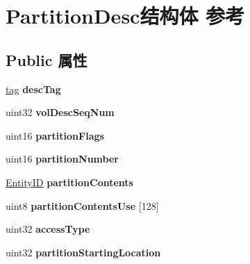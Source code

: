 \hypertarget{struct_partition_desc}{}\section{Partition\+Desc结构体 参考}
\label{struct_partition_desc}
\subsection*{Public 属性}
\begin{DoxyCompactItemize}
\item 
\mbox{\label{struct_partition_desc_ad593c30334d531b7a2bec7086b858d5e}} 
\hyperlink{structtag}{tag} {\bfseries desc\+Tag}
\item 
\mbox{\label{struct_partition_desc_aef4572ab5e618cb780607acfc39feb08}} 
uint32 {\bfseries vol\+Desc\+Seq\+Num}
\item 
\mbox{\label{struct_partition_desc_a9b502351c19a5cbfe77955ba0ca4bff6}} 
uint16 {\bfseries partition\+Flags}
\item 
\mbox{\label{struct_partition_desc_ad5e77ffa7847135ea9206327bab3f849}} 
uint16 {\bfseries partition\+Number}
\item 
\mbox{\label{struct_partition_desc_aae3e6e835a287fcccd18d990a566ca1c}} 
\hyperlink{struct_entity_i_d}{Entity\+ID} {\bfseries partition\+Contents}
\item 
\mbox{\label{struct_partition_desc_ac922bc92cdde44a2eca6a3215742e72d}} 
uint8 {\bfseries partition\+Contents\+Use} \mbox{[}128\mbox{]}
\item 
\mbox{\label{struct_partition_desc_a8ab955d10bdfb72952bf9b12737ba49f}} 
uint32 {\bfseries access\+Type}
\item 
\mbox{\label{struct_partition_desc_a30e75269917b384cd821fec1238e3829}} 
uint32 {\bfseries partition\+Starting\+Location}
\item 
\mbox{\label{struct_partition_desc_ac4e484ef1b0569ed2883a8c636156e64}} 

\end{DoxyCompactItemize}
